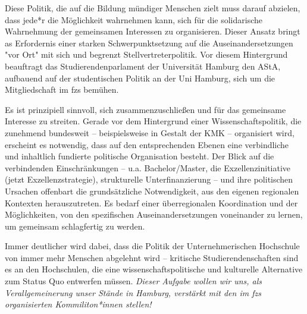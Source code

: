 \documentclass[ngerman,headheight=70pt]{scrartcl}
\begin{document}
    Diese Politik, die auf die Bildung mündiger Menschen zielt muss darauf abzielen,
    dass jede*r die Möglichkeit wahrnehmen kann, sich für die solidarische
    Wahrnehmung der gemeinsamen Interessen zu organisieren. Dieser Ansatz bringt
    as Erfordernis einer starken Schwerpunktsetzung auf die Auseinandersetzungen
    "vor Ort" mit sich und begrenzt Stellvertreterpolitik. Vor diesem Hintergrund
    beauftragt das Studierendenparlament der Universität Hamburg den AStA,
    aufbauend auf der studentischen Politik an der Uni Hamburg, sich um die
    Mitgliedschaft im fzs bemühen.

    Es ist prinzipiell sinnvoll, sich
    zusammenzuschließen und für das gemeinsame Interesse zu streiten. Gerade vor
    dem Hintergrund einer Wissenschaftspolitik, die zunehmend bundesweit --
    beispielsweise in Gestalt der KMK – organisiert wird, erscheint es notwendig,
    dass auf den entsprechenden Ebenen eine verbindliche und inhaltlich fundierte
    politische Organisation besteht. Der Blick auf die verbindenden Einschränkungen
    -- u.a. Bachelor/Master, die Exzellenzinitiative (jetzt Exzellenzstrategie),
    strukturelle Unterfinanzierung -- und ihre politischen Ursachen offenbart die
    grundsätzliche Notwendigkeit, aus den eigenen regionalen Kontexten
    herauszutreten. Es bedarf einer überregionalen Koordination und der
    Möglichkeiten, von den spezifischen Auseinandersetzungen voneinander zu
    lernen, um gemeinsam schlagfertig zu werden.

    Immer deutlicher wird dabei, dass die Politik der Unternehmerischen Hochschule
    von immer mehr Menschen abgelehnt wird – kritische Studierendenschaften sind
    es an den Hochschulen, die eine wissenschaftspolitische und kulturelle
    Alternative zum Status Quo entwerfen müssen.
    \textit{Dieser Aufgabe wollen wir uns, als Verallgemeinerung unser Stände in
    Hamburg, verstärkt mit den im fzs organisierten Kommiliton*innen stellen!}
\end{document}
